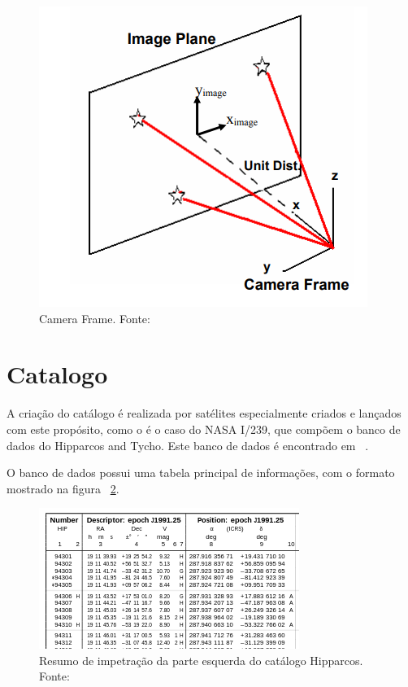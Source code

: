 \begin{figure}[h]
	\centering
	\includegraphics[width=.7\columnwidth]{images/Camera_Frame.png}
	\caption{Camera Frame. Fonte: ~\cite[]{Diaz}}
	\label{fig:Camera_Frame}
\end{figure}

\section{Catalogo}

A criação do catálogo é realizada por satélites especialmente criados e lançados com este propósito, como o é o caso do NASA I/239, que compõem o banco de dados do Hipparcos and Tycho. Este banco de dados é encontrado em ~\cite[]{ESA}.

O banco de dados possui uma tabela principal de informações, com o formato mostrado na figura ~\ref{fig:Resumo_impetracao_parte_esquerda_Hipparcos}.

\begin{figure}[h]
	\centering
	\includegraphics[width=.7\columnwidth]{images/Resumo_impetracao_parte_esquerda_Hipparcos.png}
	\caption{Resumo de impetração da parte esquerda do catálogo Hipparcos. Fonte: ~\cite[]{ESA}}
	\label{fig:Resumo_impetracao_parte_esquerda_Hipparcos}
\end{figure}


